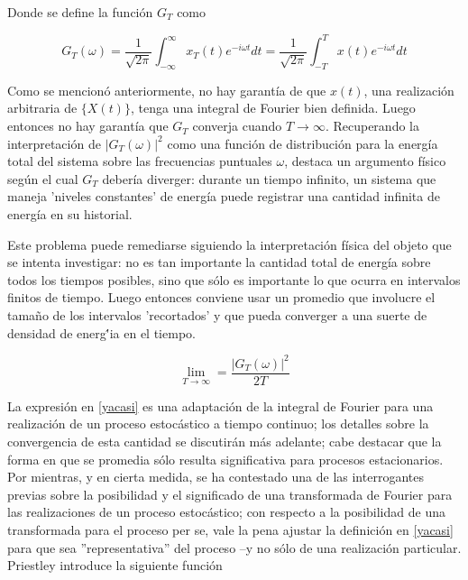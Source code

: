 \documentclass[12pt,a4paper]{mitthesis}
\newcommand{\intR}{\int_{-\infty}^{\infty}}
\begin{document}

Donde se define la funci\'on $G_T$ como

\begin{equation}
G_T (\omega) = \frac{1}{\sqrt{2 \pi}} \intR x_T(t) e^{-i \omega t} dt
= \frac{1}{\sqrt{2 \pi}} \int_{-T}^{T} x(t) e^{-i \omega t} dt
\end{equation}

Como se mencion\'o anteriormente, no hay garant\'ia de que $x(t)$, una realizaci\'on arbitraria de
$\{X(t)\}$, tenga una integral de Fourier bien definida. Luego entonces no hay garant\'ia que 
$G_T$ converja cuando $T\rightarrow \infty$. Recuperando la interpretaci\'on de 
$\left| G_T(\omega) \right|^{2}$ como una funci\'on de distribuci\'on para la energ\'ia total del 
sistema sobre las frecuencias puntuales $\omega$, destaca un argumento f\'isico seg\'un el cual 
$G_T$ {deber\'ia} diverger: durante un tiempo infinito, un sistema que maneja 'niveles constantes' 
de energ\'ia puede registrar una cantidad infinita de energ\'ia en su historial. 

Este problema puede remediarse siguiendo la interpretaci\'on f\'isica del objeto que se intenta 
investigar: no es tan importante la cantidad total de energ\'ia sobre todos los tiempos posibles, 
sino que s\'olo es importante lo que ocurra en intervalos finitos de tiempo.
Luego entonces conviene usar un promedio que involucre el tama\~no de los intervalos 'recortados' 
y que pueda converger a una suerte de densidad de energ\''ia en el tiempo.

\begin{equation}
\lim_{T\rightarrow{\infty}} = \frac{ \left| G_T(\omega) \right|^{2}}{2 T}
\label{yacasi}
\end{equation}

La expresi\'on en \ref{yacasi} es una adaptaci\'on de la integral de Fourier para una realizaci\'on
de un proceso estoc\'astico a tiempo continuo; los detalles sobre la convergencia de esta 
cantidad se discutir\'an m\'as adelante; cabe destacar que la forma en que se promedia s\'olo 
resulta significativa para procesos estacionarios.
Por mientras, y en cierta medida, se ha contestado una de las interrogantes previas sobre la 
posibilidad y el significado de una transformada de Fourier para las realizaciones de un proceso 
estoc\'astico; con respecto a la posibilidad de una transformada para el proceso per se, vale la 
pena ajustar la definici\'on en \ref{yacasi} para que sea ''representativa'' del proceso --y no 
s\'olo de una realizaci\'on particular. Priestley introduce la siguiente funci\'on
\end{document}

